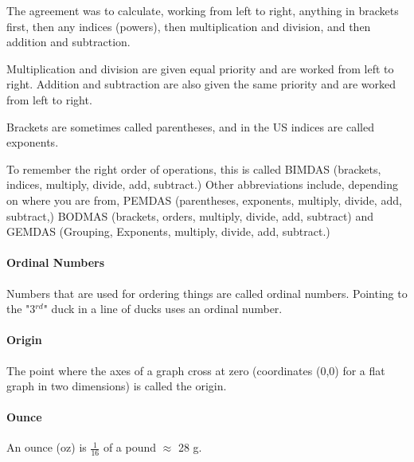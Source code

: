 \documentclass[12pt]{article}
\begin{document}
{The agreement was to calculate, working from left to right,  anything in brackets first, then any indices (powers), then multiplication and division, and then addition and subtraction.

Multiplication and division are given equal priority and are worked from left to right. Addition and subtraction are also given the same priority and are worked from left to right.

Brackets are sometimes called parentheses, and in the US indices are called exponents.

To remember the right order of operations, this is called BIMDAS (brackets, indices, multiply, divide, add, subtract.) Other abbreviations include, depending on where you are from, PEMDAS (parentheses, exponents, multiply, divide, add, subtract,) BODMAS (brackets, orders, multiply, divide, add, subtract) and GEMDAS (Grouping, Exponents, multiply, divide, add, subtract.)

\paragraph{Ordinal Numbers}
Numbers that are used for ordering things are called ordinal numbers. Pointing to the "$3{^{rd}}$" duck in a line of ducks uses an ordinal number.

\paragraph{Origin}
The point where the axes of a graph cross at zero (coordinates (0,0) for a flat graph in two dimensions) is called the origin.
\begin{center}
\end{center}

\paragraph{Ounce}
An ounce (oz) is $\frac{1}{16}$ of a pound $\approx$ 28 g.
 
}
\end{document}
